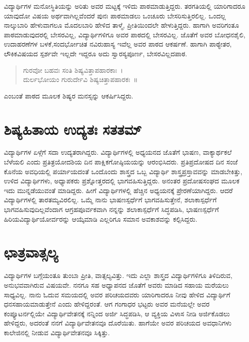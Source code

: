 {ವಿದ್ಯಾರ್ಥಿಗಳ ಮನೋಸ್ಥಿತಿಯನ್ನು ಅರಿತು ಅವರ ಮಟ್ಟಕ್ಕೆ ಇಳಿದು ಪಾಠಮಾಡುತ್ತಿದ್ದರು. ತರಗತಿಯಲ್ಲಿ ಯಾರಿಗಾದರೂ ಯಾವುದೋ ವಿಷಯ ಅರ್ಥವಾಗಿಲ್ಲವೆಂದರೆ ಪುನಃ ಪಾಠಮಾಡಲು ಒಂಚೂರು ಬೇಸರಿಸುತ್ತಿರಲಿಲ್ಲ. ಒಂದಲ್ಲ ನಾಲ್ಕುಬಾರಿ ಹೇಳುವಾಗಲೂ ಮೊದಲಬಾರಿ ಹೇಳಿದ ತಾಳ್ಮೆ, ಪ್ರೀತಿಯಿಂದಲೇ ಹೇಳುತ್ತಿದ್ದರು. ಹಾಗಾಗಿ ಅವರಿಗಂತೂ ಪಾಠಮಾಡುವುದರಲ್ಲಿ ಬೇಸರವಿಲ್ಲ, ವಿದ್ಯಾರ್ಥಿಗಳಿಗೂ ಅವರ ಪಾಠದಲ್ಲಿ ಬೇಸರ\-ವಿಲ್ಲ. ಜೊತೆಗೆ ಅವರ ಬೋಧನಶೈಲಿ, ಉದಾಹರಣೆಗಳ ಬಳಕೆ,\break ಸಂದರ್ಭೋಚಿತ ನವಿರುಹಾಸ್ಯ ಇವೆಲ್ಲ ಅವರ ಪಾಠದ ಆಕರ್ಷಣೆ. ಹಾಗಾಗಿ ಪಾಠ್ಯೇತರ, ಲೌಕಿಕವಿಷಯದ ಸ್ಪರ್ಶವೇ ಇಲ್ಲದೇ ಇದ್ದರೂ ಅದು ಸ್ವಾರಸ್ಯಪೂರ್ಣ, ಬೇಸರ\-ವಿಲ್ಲದಪಾಠ.
\begin{verse}
ಗುರವೋ ಬಹವಃ ಸಂತಿ ಶಿಷ್ಯವಿತ್ತಾಪಹಾರಕಾಃ~।\\
ದುರ್ಲಭೋಯಂ ಗುರುರ್ದೇವಿ ಶಿಷ್ಯಚಿತ್ತಾಪಹಾರಕಃ~॥
\end{verse}
ಎಂಬಂತೆ ಪಾಠದ ಮೂಲಕ ಶಿಷ್ಯರ ಮನಸ್ಸನ್ನು ಆಕರ್ಷಿಸಿದ್ದರು.

\section*{ಶಿಷ್ಯಹಿತಾಯ ಉದ್ಯತಃ ಸತತಮ್}

ವಿದ್ಯಾರ್ಥಿಗಳ ಏಳ್ಗೆಗೆ ಸದಾ ಉದ್ಯತರಾಗಿದ್ದರು. ವಿದ್ಯಾರ್ಥಿಗಳಲ್ಲಿ ಅಧ್ಯಯನದ ಜೊತೆಗೆ ಭಾಷಣ, ವಾಕ್ಯಾರ್ಥಕಲೆ ಬೆಳೆಯಲಿ ಎಂದು ಪ್ರತಿತ್ರಯೋದಶಿಯ ದಿನ ಪಾಕ್ಷಿಕ\-ಗೋಷ್ಠಿಯಯನ್ನು ಆರಂಭಿಸಿದರು. ಪ್ರತಿಪ್ರದೋಷದ ದಿನ ಸಂಜೆ ಕೊನೆಯ ಅವಧಿ\-ಯಲ್ಲಿ ಪರ್ಯಾಯದಂತೆ ಒಂದೊಂದು ಶಾಸ್ತ್ರದ ಒಬ್ಬ ವಿದ್ಯಾರ್ಥಿ ಶಾಸ್ತ್ರ\-ಪ್ರಸ್ತಾವವನ್ನು ಮಾಡಬೇಕಿತ್ತು, ಉಳಿದ ವಿದ್ಯಾರ್ಥಿಗಳು, ಅಧ್ಯಾಪಕರು ಪ್ರಶ್ನೋತ್ತರದಲ್ಲಿ ಭಾಗವಹಿ\-ಸುತ್ತಿದ್ದರು. ಅನಂತರ ಪ್ರದೋಷಸಂಘದ ಮೂಲಕ ಇದು ಮುನ್ನಡೆ\-ಯುವಂತೆ ಮಾಡಿದ್ದರು. ಹೀಗೆ ವಿದ್ಯಾರ್ಥಿಗಳಲ್ಲಿ ಹೆಚ್ಚಿನ ಅಧ್ಯಯನಕ್ಕೆ ಪ್ರೇರಣೆ\-ಯಾಗಿದ್ದರು. ಆದರೆ ವಿದ್ಯಾರ್ಥಿಗಳಲ್ಲಿ ತಾರತಮ್ಯವಿರಲಿಲ್ಲ. ಒಮ್ಮೆ ನಾನು ಭಾಷಣ\-ಸ್ಪರ್ಧೆಗೆ ಭಾಗವಹಿಸುತ್ತೇನೆ, ಶಲಾಕಾಸ್ಪರ್ಧೆಗೆ ಭಾಗವಹಿಸುವುದಿಲ್ಲವೆಂದಾಗ ಆಗ್ರಹ\-ಪೂರ್ವಕವಾಗಿ ನನ್ನನ್ನು ಶಲಾಕಾಸ್ಪರ್ಧೆಗೆ ಸಿದ್ಧಪಡಿಸಿ, ಭಾಷಣಸ್ಪರ್ಧೆಗೆ ಹಿರಿಯ\-ವಿದ್ಯಾರ್ಥಿ\-ಯೋರ್ವರನ್ನು ಆಯ್ಕೆಮಾಡಿ ಎಲ್ಲರಿಗೂ ಸಮಾನ ಅವಕಾಶವನ್ನು ಕಲ್ಪಿಸಿದ್ದರು.

\section*{ಛಾತ್ರವಾತ್ಸಲ್ಯ}

ವಿದ್ಯಾರ್ಥಿಗಳ ಬಗ್ಗೆಯಂತೂ ತುಂಬಾ ಪ್ರೀತಿ, ವಾತ್ಸಲ್ಯವಿತ್ತು. ಇದು ಎಲ್ಲಾ ಶಾಸ್ತ್ರದ ವಿದ್ಯಾರ್ಥಿಗಳಿಗೂ ತಿಳಿದಿರುವ, ಅನುಭವವಾಗಿರುವ ವಿಷಯವೇ. ನನಗೂ ಸಹ ಅಧ್ಯಾಪನದ ಜೊತೆಗೆ ಅವರು ಮಾಡಿದ ಸಹಾಯ ಮರೆಯಲು ಸಾಧ್ಯವಿಲ್ಲ. ನಾನು ಓದುವ ಸಮಯದಲ್ಲಿ ಅವರ ಪರಿಚಯದವರು ಯಾರಿಗಾದರೂ ನೀವು ಹೇಳಿದ ವಿದ್ಯಾರ್ಥಿಗೆ ಧನಸಹಾಯಮಾಡುತ್ತೇನೆ ಎಂದು ಹೇಳಿದ್ದರಂತೆ. ಆಗ ಗಂಗಾಧರ ಭಟ್ಟರು ಅವರ ಮನೆಯಲ್ಲೇ ಅವರ ಕಂಪ್ಯೂಟರ್ನಲ್ಲಿಯೇ ವಿದ್ಯಾರ್ಥಿವೇತನಕ್ಕೆ ನನ್ನಿಂದ ಅರ್ಜಿ ಸಿದ್ಧಪಡಿಸಿ, ಆ ವ್ಯಕ್ತಿಯ ವಿಳಾಸ ನೀಡಿ ಅರ್ಜಿಕೊಡಲು ಹೇಳಿದ್ದರು, ಅದರಂತೆ ನನಗೆ ವಿದ್ಯಾರ್ಥಿವೇತನವೂ ದೊರೆಯಿತು. ಹಾಗೆಯೇ ಅವರ ಪರಿಚಯದ ಅವಧಾನಿಗಳು ಕಾಲೇಜಿನಲ್ಲಿ ನೀಡುವ ವಿದ್ಯಾರ್ಥಿವೇತನವೂ ಸಿಕ್ಕಿತ್ತು.

}
